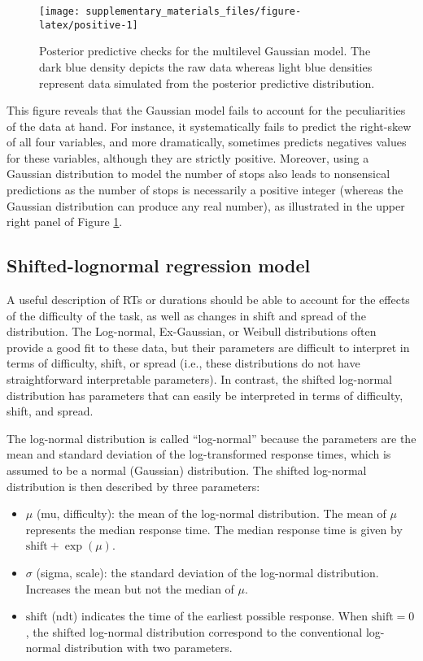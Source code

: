 \documentclass[
  11pt,
  english,
  ,doc,floatsintext]{apa6}
\begin{document}
\begin{figure}[!htb]

{\centering \texttt{[image: supplementary\_materials\_files/figure-latex/positive-1]} 

}

\caption{Posterior predictive checks for the multilevel Gaussian model. The dark blue density depicts the raw data whereas light blue densities represent data simulated from the posterior predictive distribution.}\label{fig:positive}
\end{figure}

This figure reveals that the Gaussian model fails to account for the peculiarities of the data at hand. For instance, it systematically fails to predict the right-skew of all four variables, and more dramatically, sometimes predicts negatives values for these variables, although they are strictly positive. Moreover, using a Gaussian distribution to model the number of stops also leads to nonsensical predictions as the number of stops is necessarily a positive integer (whereas the Gaussian distribution can produce any real number), as illustrated in the upper right panel of Figure \ref{fig:positive}.

\hypertarget{shifted-lognormal-regression-model}{%
\subsection{Shifted-lognormal regression model}\label{shifted-lognormal-regression-model}}

A useful description of RTs or durations should be able to account for the effects of the difficulty of the task, as well as changes in shift and spread of the distribution. The Log-normal, Ex-Gaussian, or Weibull distributions often provide a good fit to these data, but their parameters are difficult to interpret in terms of difficulty, shift, or spread (i.e., these distributions do not have straightforward interpretable parameters). In contrast, the shifted log-normal distribution has parameters that can easily be interpreted in terms of difficulty, shift, and spread.

The log-normal distribution is called ``log-normal'' because the parameters are the mean and standard deviation of the log-transformed response times, which is assumed to be a normal (Gaussian) distribution. The shifted log-normal distribution is then described by three parameters:

\begin{itemize}
\item
  \(\mu\) (mu, difficulty): the mean of the log-normal distribution. The mean of \(\mu\)
  represents the median response time. The median response time is given by \(\text{shift} + \exp (\mu)\).
\item
  \(\sigma\) (sigma, scale): the standard deviation of the log-normal distribution. Increases the mean but not the median of \(\mu\).
\item
  \(\text{shift}\) (ndt) indicates the time of the earliest possible response. When \(\text{shift} = 0\), the shifted log-normal distribution correspond to the conventional log-normal distribution with two parameters.
\end{itemize}
\end{document}
